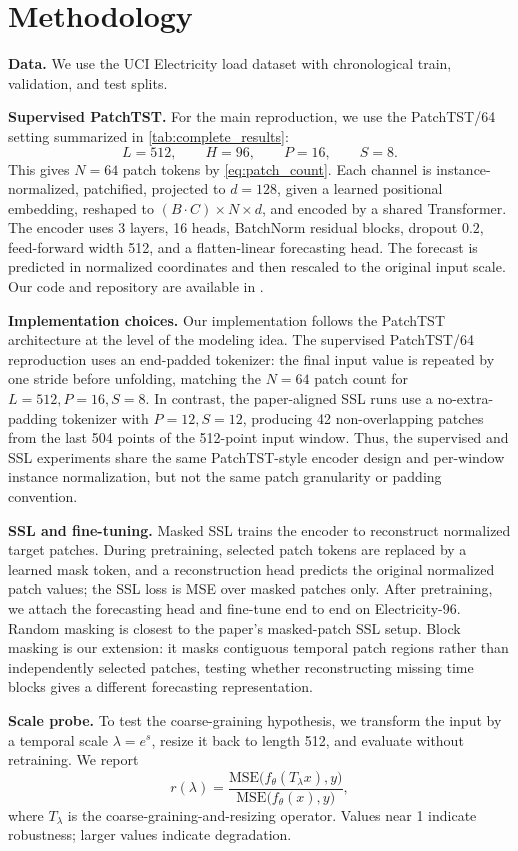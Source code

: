 \documentclass[11pt,twocolumn]{article}
\begin{document}
\section{Methodology}

\textbf{Data.} We use the UCI Electricity \cite{electricity} load dataset with chronological train, validation, and test splits. 

\textbf{Supervised PatchTST.} For the main reproduction, we use the PatchTST/64 setting summarized in \autoref{tab:complete_results}:
\[
L=512,\qquad H=96,\qquad P=16,\qquad S=8.
\]
This gives $N=64$ patch tokens by \eqref{eq:patch_count}. Each channel is instance-normalized, patchified, projected to $d=128$, given a learned positional embedding, reshaped to $(B\cdot C)\times N\times d$, and encoded by a shared Transformer. The encoder uses 3 layers, 16 heads, BatchNorm residual blocks, dropout $0.2$, feed-forward width 512, and a flatten-linear forecasting head. The forecast is predicted in normalized coordinates and then rescaled to the original input scale. Our code and repository are available in \cite{Repo}.

\textbf{Implementation choices.} Our implementation follows the PatchTST architecture at the level of the modeling idea. The supervised PatchTST/64 reproduction uses an end-padded tokenizer: the final input value is repeated by one stride before unfolding, matching the $N=64$ patch count for $L=512,P=16,S=8$. In contrast, the paper-aligned SSL runs use a no-extra-padding tokenizer with $P=12,S=12$, producing 42 non-overlapping patches from the last 504 points of the 512-point input window. Thus, the supervised and SSL experiments share the same PatchTST-style encoder design and per-window instance normalization, but not the same patch granularity or padding convention.

\textbf{SSL and fine-tuning.} Masked SSL trains the encoder to reconstruct normalized target patches. During pretraining, selected patch tokens are replaced by a learned mask token, and a reconstruction head predicts the original normalized patch values; the SSL loss is MSE over masked patches only. After pretraining, we attach the forecasting head and fine-tune end to end on Electricity-96. Random masking is closest to the paper's masked-patch SSL setup. Block masking is our extension: it masks contiguous temporal patch regions rather than independently selected patches, testing whether reconstructing missing time blocks gives a different forecasting representation.

\textbf{Scale probe.} To test the coarse-graining hypothesis, we transform the input by a temporal scale $\lambda=e^s$, resize it back to length 512, and evaluate without retraining. We report
\begin{equation}
\label{eq:scale_ratio}
r(\lambda)=
\frac{\mathrm{MSE}\bigl(f_\theta(T_\lambda x),y\bigr)}
{\mathrm{MSE}\bigl(f_\theta(x),y\bigr)},
\end{equation}
where $T_\lambda$ is the coarse-graining-and-resizing operator. Values near 1 indicate robustness; larger values indicate degradation.
\end{document}

